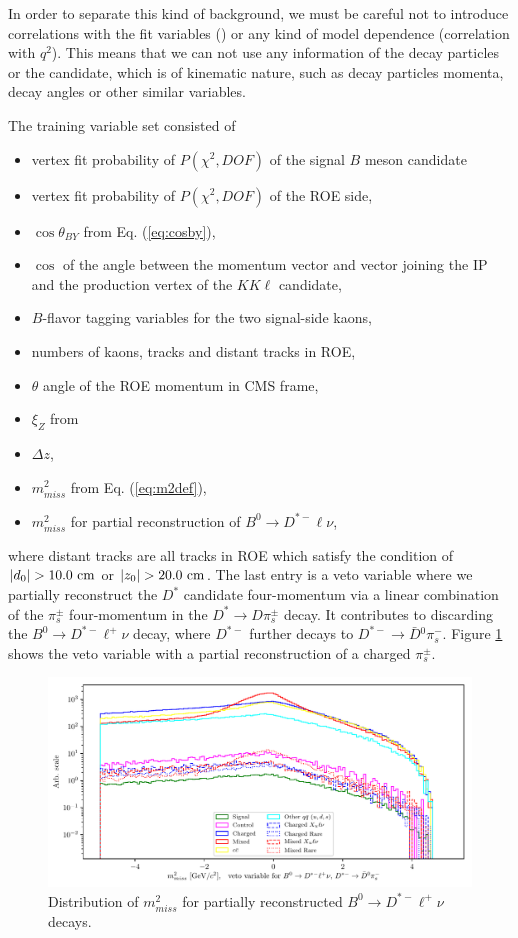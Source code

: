 In order to separate this kind of background, we must be careful not to introduce correlations with the fit variables (\vars) or any kind of model dependence (correlation with $q^2$). This means that we can not use any information of the decay particles or the candidate, which is of kinematic nature, such as decay particles momenta, decay angles or other similar variables.

The training variable set consisted of
\begin{itemize}
	\item vertex fit probability of $P(\chi^2,DOF)$ of the signal $B$ meson candidate
	\item vertex fit probability of $P(\chi^2,DOF)$ of the ROE side,
	\item $\cos\theta_{BY}$ from Eq. (\ref{eq:cosby}),
	\item $\cos$ of the angle between the momentum vector and vector joining the IP and the production vertex of the $KK\ell$ candidate,
	\item $B$-flavor tagging variables for the two signal-side kaons,
	\item numbers of kaons, tracks and distant tracks in ROE,
	\item $\theta$ angle of the ROE momentum in CMS frame,
	\item $\xi_Z$ from \cite{PhysRevD.83.032007}
	\item $\Delta z$,
	\item $m_{miss}^2$ from Eq. (\ref{eq:m2def}),
	\item $m_{miss}^2$ for partial reconstruction of $B^0 \to D^{*-} \ell \nu$,
\end{itemize}
where distant tracks are all tracks in ROE which satisfy the condition of $\vert d_0 \vert  > 10.0\mathrm{~cm}$ or $\vert z_0 \vert > 20.0\mathrm{~cm}$. The last entry is a veto variable where we partially reconstruct the $D^*$ candidate four-momentum via a linear combination of the $\pi^\pm_s$ four-momentum in the $D^* \to D \pi_s^\pm$ decay. It contributes to discarding the $B^0 \to D^{*-} \ell^+ \nu$ decay, where $D^{*-}$ further decays to $D^{*-} \to \bar D {}^0 \pi^-_s$. Figure \ref{fig:vetoplot} shows the veto variable with a partial reconstruction of a charged $\pi_s^\pm$.

\begin{figure}[H]
	\centering
	\captionsetup{width=0.8\linewidth}
	\includegraphics[width=\linewidth]{fig/bb_partial_veto}
	\caption{Distribution of $m_{miss}^2$ for partially reconstructed $B^0 \to D^{*-} \ell^+ \nu$ decays.}
	\label{fig:vetoplot}
\end{figure}

